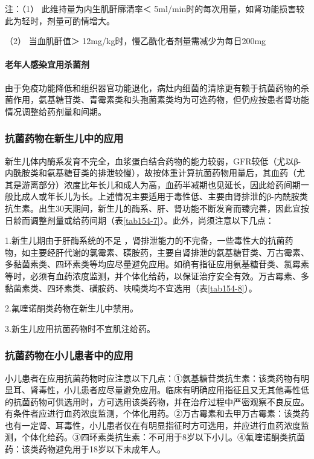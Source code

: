 注：（1） 此维持量为内生肌酐廓清率＜
5ml/min时的每次用量，如肾功能损害较此为轻时，剂量可酌情增大。

（2） 当血肌酐值＞ 12mg/kg时，慢乙酰化者剂量需减少为每日200mg

\paragraph{老年人感染宜用杀菌剂}

由于免疫功能降低和组织器官功能退化，病灶内细菌的清除更有赖于抗菌药物的杀菌作用，氨基糖苷类、青霉素类和头孢菌素类均为可选药物，但仍应按患者肾功能情况调整给药剂量和间期。

\subsubsection{抗菌药物在新生儿中的应用}

新生儿体内酶系发育不完全，血浆蛋白结合药物的能力较弱，GFR较低（尤以β-内酰胺类和氨基糖苷类的排泄较慢），故按体重计算抗菌药物用量后，其血药（尤其是游离部分）浓度比年长儿和成人为高，血药半减期也见延长，因此给药间期一般比成人或年长儿为长。上述情况主要适用于毒性低、主要由肾排泄的β-内酰胺类抗生素。出生30天期间，新生儿的酶系、肝、肾功能不断发育而臻完善，因此宜按日龄而调整剂量或给药间期（表\ref{tab154-7}）。此外，尚须注意以下几点：

1.新生儿期由于肝酶系统的不足
，肾排泄能力的不完备，一些毒性大的抗菌药物，如主要经肝代谢的氯霉素、磺胺药，主要自肾排泄的氨基糖苷类、万古霉素、多黏菌素类、四环素类等均应尽量避免应用。如确有指征应用氨基糖苷类、氯霉素等时，必须有血药浓度监测，并个体化给药，以保证治疗安全有效。万古霉素、多黏菌素类、四环素类、磺胺药、呋喃类均不宜选用（表\ref{tab154-8}）。

2.氟喹诺酮类药物在新生儿中禁用。

3.新生儿应用抗菌药物时不宜肌注给药。

\subsubsection{抗菌药物在小儿患者中的应用}

小儿患者在应用抗菌药物时应注意以下几点：①氨基糖苷类抗生素：该类药物有明显耳、肾毒性，小儿患者应尽量避免应用。临床有明确应用指征且又无其他毒性低的抗菌药物可供选用时，方可选用该类药物，并在治疗过程中严密观察不良反应。有条件者应进行血药浓度监测，个体化用药。②万古霉素和去甲万古霉素：该类药也有一定肾、耳毒性，小儿患者仅在有明显指征时方可选用，并应进行血药浓度监测，个体化给药。③四环素类抗生素：不可用于8岁以下小儿。④氟喹诺酮类抗菌药：该类药物避免用于18岁以下未成年人。

